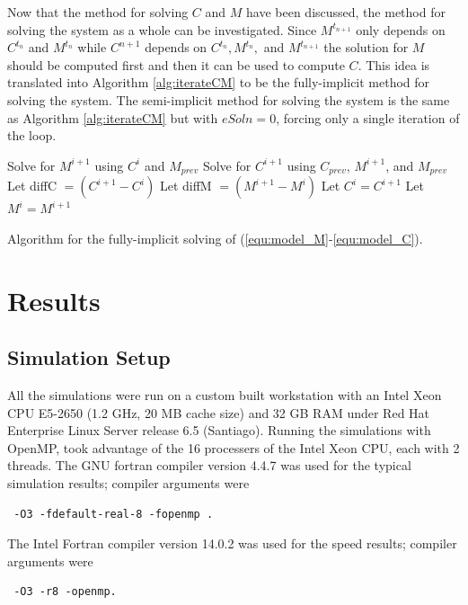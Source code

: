\documentclass{article}
\theoremstyle{plain}
\begin{document}
  Now that the method for solving $C$ and $M$ have been discussed, the method for solving the system as a whole can be investigated. 
  Since $M^{t_{n+1}}$ only depends on $C^{t_n}$ and $M^{t_n}$ while $C^{n+1}$ depends on $C^{t_n}, M^{t_n},$ and $M^{t_{n+1}}$ the solution for $M$ should be computed first and then it can be used to compute $C$. 
  This idea is translated into Algorithm \ref{alg:iterateCM} to be the fully-implicit method for solving the system.
  The semi-implicit method for solving the system is the same as Algorithm \ref{alg:iterateCM} but with $eSoln = 0$, forcing only a single iteration of the loop.

  \begin{algorithm}[h!tb]
    \Begin
    {
      {
          Solve for $M^{i+1}$ using $C^{i}$ and $M_{prev}$\;
          Solve for $C^{i+1}$ using $C_{prev}$, $M^{i+1}$, and $M_{prev}$\;
          Let diffC $=  (C^{i+1} - C^i)$\;
          Let diffM $= (M^{i+1} - M^i)$\;
          Let $C^{i} = C^{i+1}$
          Let $M^{i} = M^{i+1}$\;
      }
    }
    \caption{Algorithm for the fully-implicit solving of (\ref{equ:model_M}-\ref{equ:model_C}).}
    \label{alg:iterateCM}
  \end{algorithm}



\section{Results}
  \subsection{Simulation Setup}
    All the simulations were run on a custom built workstation with an Intel Xeon CPU E5-2650 (1.2 GHz, 20 MB cache size) and 32 GB RAM under Red Hat Enterprise Linux Server release 6.5 (Santiago). 
    Running the simulations with OpenMP, took advantage of the 16 processers of the Intel Xeon CPU, each with 2 threads. 
    The GNU fortran compiler version 4.4.7 was used for the typical simulation results; compiler arguments were \begin{verbatim} -O3 -fdefault-real-8 -fopenmp .\end{verbatim}
    The Intel Fortran compiler version 14.0.2 was used for the speed results; compiler arguments were \begin{verbatim} -O3 -r8 -openmp. \end{verbatim}
\end{document}
